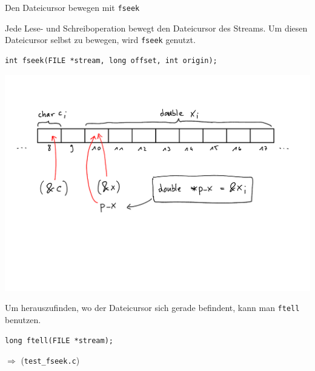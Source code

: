 \documentclass[xcolor=dvipsnames]{beamer}
\begin{document}
\begin{frame}[fragile]{Den Dateicursor bewegen mit \texttt{fseek}}
\begin{block}{}
  Jede Lese- und Schreiboperation bewegt den Dateicursor des Streams. Um diesen Dateicursor selbst zu bewegen, wird \verb|fseek| genutzt.
\end{block}
\begin{lstlisting}
int fseek(FILE *stream, long offset, int origin);
\end{lstlisting}
\includegraphics[width=\textwidth,page=5,trim=0 13cm 0 2cm,clip=true]{graphics/c_kurs_tafel}
\begin{block}{}
  Um herauszufinden, wo der Dateicursor sich gerade befindent, kann man \verb|ftell| benutzen.
\end{block}
\begin{lstlisting}
long ftell(FILE *stream);
\end{lstlisting}
$\Rightarrow$ (\verb|test_fseek.c|)
\end{frame}
\end{document}
